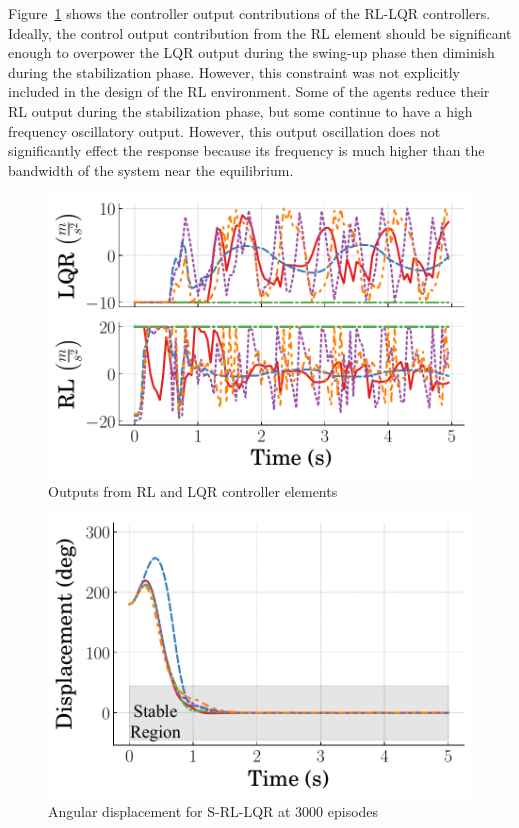 Figure~\ref{fig:RL_LQR_input} shows the controller output contributions of the RL-LQR controllers.
%
Ideally, the control output contribution from the RL element should be significant enough to overpower the LQR output during the swing-up phase then diminish during the stabilization phase.
%
However, this constraint was not explicitly included in the design of the RL environment. Some of the agents reduce their RL output during the stabilization phase, but some continue to have a high frequency oscillatory output. However, this output oscillation does not significantly effect the response because its frequency is much higher than the bandwidth of the system near the equilibrium.
%
\begin{figure}[t]
    \centering
    \includegraphics[scale=0.65]{figures/figures_RL_model_based_control/Input_RL_LQR}
    \caption{Outputs from RL and LQR controller elements}
    \label{fig:RL_LQR_input}
\end{figure}
%
\begin{figure}[t]
    \centering
    \includegraphics[scale=0.65]{figures/figures_RL_model_based_control/Angular_displacement_switching}
    \caption{Angular displacement for S-RL-LQR at 3000 episodes}
    \label{fig:S_RL_LQR_disp}
\end{figure}
%

